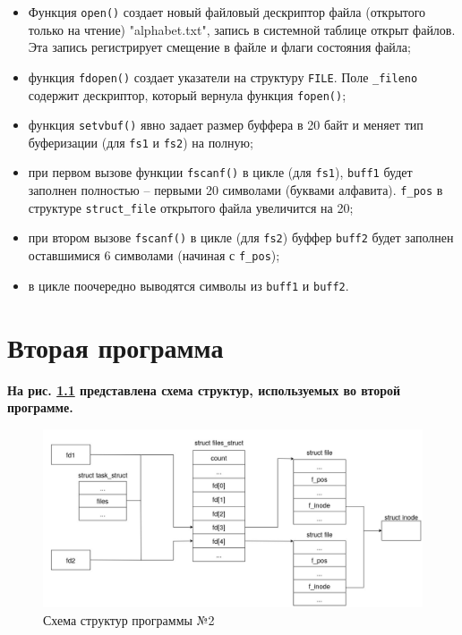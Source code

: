 \documentclass[12pt]{report}
\begin{document}
\begin{itemize}
	\item Функция \texttt{open()} создает новый файловый дескриптор файла (открытого только на чтение) "alphabet.txt", запись в системной таблице открыт файлов. Эта запись регистрирует смещение в файле и флаги состояния файла;
	
	\item функция \texttt{fdopen()} создает указатели на структуру \texttt{FILE}. Поле \texttt{\_fileno} содержит дескриптор, который вернула функция \texttt{fopen()};
	
	\item функция \texttt{setvbuf()} явно задает размер буффера в 20 байт и меняет тип буферизации (для \texttt{fs1} и \texttt{fs2}) на полную;
	
	\item при первом вызове функции \texttt{fscanf()} в цикле (для \texttt{fs1}), \texttt{buff1} будет заполнен полностью -- первыми 20 символами (буквами алфавита). \texttt{f\_pos} в структуре \texttt{struct\_file} открытого файла увеличится на 20;
	
	\item при втором вызове \texttt{fscanf()} в цикле (для \texttt{fs2}) буффер \texttt{buff2} будет заполнен оставшимися 6 символами (начиная с \texttt{f\_pos});
	
	\item в цикле поочередно выводятся символы из \texttt{buff1} и \texttt{buff2}.
\end{itemize}



\chapter{Вторая программа}

\textbf{На рис. \ref{fig:prog_02_schema} представлена схема структур, используемых во второй программе.}

\begin{figure}[H]
	\centering
	\includegraphics[scale=0.4]{img/prog_02_schema.jpg}
	\caption{Схема структур программы №2}
	\label{fig:prog_02_schema}
\end{figure}
\end{document}

